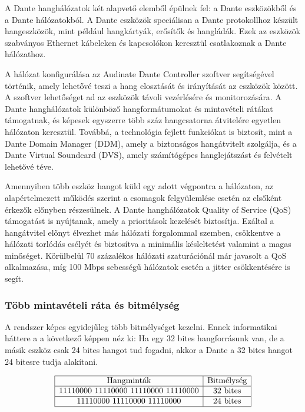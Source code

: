 A Dante hanghálózatok két alapvető elemből épülnek fel: a Dante eszközökből és a Dante hálózatokból. 
A Dante eszközök speciálisan a Dante protokollhoz készült hangeszközök, mint például hangkártyák, erősítők és hangládák. 
Ezek az eszközök szabványos Ethernet kábeleken és kapcsolókon keresztül csatlakoznak a Dante hálózathoz. 

A hálózat konfigurálása az Audinate Dante Controller szoftver segítségével történik, amely lehetővé teszi a hang elosztását és 
irányítását az eszközök között. A szoftver lehetőséget ad az eszközök távoli vezérlésére és monitorozására. 
A Dante hanghálózatok különböző hangformátumokat és mintavételi rátákat támogatnak, és képesek egyszerre több száz hangcsatorna 
átvitelére egyetlen hálózaton keresztül. Továbbá, a technológia fejlett funkciókat is biztosít, mint a Dante Domain Manager (DDM), 
amely a biztonságos hangátvitelt szolgálja, és a Dante Virtual Soundcard (DVS), amely számítógépes hanglejátszást és felvételt 
lehetővé téve.

Amennyiben több eszköz hangot küld egy adott végpontra a hálózaton, az alapértelmezett működés szerint a csomagok felgyülemlése 
esetén az elsőként érkezők előnyben részesülnek. A Dante hanghálózatok Quality of Service (QoS) támogatást is nyújtanak, 
amely a prioritások kezelését biztosítja. Ezáltal a hangátvitel előnyt élvezhet más hálózati forgalommal szemben, csökkentve 
a hálózati torlódás esélyét és biztosítva a minimális késleltetést valamint a magas minőséget. Körülbelül 70 százalékos 
hálózati szaturációnál már javasolt a QoS alkalmazása, míg 100 Mbps sebességű hálózatok esetén a jitter csökkentésére is 
segít.


\subsubsection{Több mintavételi ráta és bitmélység}

A rendszer képes egyidejűleg több bitmélységet kezelni. Ennek informatikai háttere a
a következő képpen néz ki:
Ha egy 32 bites hangforrásunk van, de a másik eszköz
csak 24 bites hangot tud fogadni, akkor a Dante a 32 bites hangot 24 bitesre tudja 
alakítani.

\begin{align*}
	\begin{array}{|c|c|}
	\hline
	\text{Hangminták} & \text{Bitmélység} \\
	\hline
	\text{11110000 11110000 11110000 11110000} & \text{32 bites} \\
	\hline
	\text{11110000 11110000 11110000} & \text{24 bites} \\
	\hline
	\end{array}
\end{align*}
	
